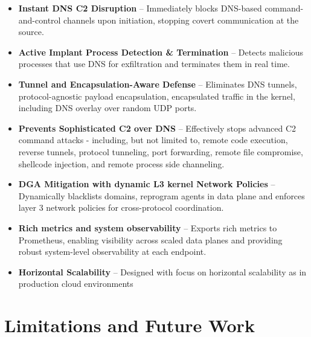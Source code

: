 \documentclass [11pt, proquest] {uwthesis}[2020/02/24]
\begin{document}
\vspace{-8pt}
\begin{itemize}[nosep]
    \item \textbf{Instant DNS C2 Disruption} – Immediately blocks DNS-based command-and-control channels upon initiation, stopping covert communication at the source.

    \item \textbf{Active Implant Process Detection \& Termination} – Detects malicious processes that use DNS for exfiltration and terminates them in real time.

    \item \textbf{Tunnel and Encapsulation-Aware Defense} – Eliminates DNS tunnels, protocol-agnostic payload encapsulation, encapsulated traffic in the kernel, including DNS overlay over random UDP ports.

    \item \textbf{Prevents Sophisticated C2 over DNS} – Effectively stops advanced C2 command attacks - including, but not limited to, remote code execution, reverse tunnels, protocol tunneling, port forwarding, remote file compromise, shellcode injection, and remote process side channeling.

    \item \textbf{DGA Mitigation with dynamic L3 kernel Network Policies} – Dynamically blacklists  domains, reprogram agents in data plane and enforces layer 3 network policies for cross-protocol coordination.

    \item \textbf{Rich metrics and system observability} – Exports rich metrics to Prometheus, enabling visibility across scaled data planes and providing robust system-level observability at each endpoint.

    \item \textbf{Horizontal Scalability} – Designed with focus on horizontal scalability as in production cloud environments 

\end{itemize}

\section{Limitations and Future Work}
\end{document}
